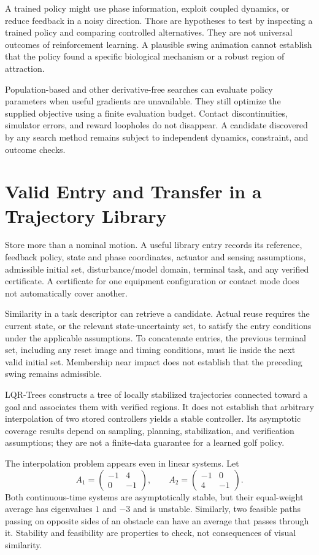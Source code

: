 \documentclass[12pt, openany]{book}
\theoremstyle{plain}
\begin{document}
A trained policy might use phase information, exploit coupled dynamics, or reduce feedback in a noisy direction. Those are hypotheses to test by inspecting a trained policy and comparing controlled alternatives. They are not universal outcomes of reinforcement learning. A plausible swing animation cannot establish that the policy found a specific biological mechanism or a robust region of attraction.

Population-based and other derivative-free searches can evaluate policy parameters when useful gradients are unavailable. They still optimize the supplied objective using a finite evaluation budget. Contact discontinuities, simulator errors, and reward loopholes do not disappear. A candidate discovered by any search method remains subject to independent dynamics, constraint, and outcome checks.

\section{Valid Entry and Transfer in a Trajectory Library}

Store more than a nominal motion. A useful library entry records its reference, feedback policy, state and phase coordinates, actuator and sensing assumptions, admissible initial set, disturbance/model domain, terminal task, and any verified certificate. A certificate for one equipment configuration or contact mode does not automatically cover another.

Similarity in a task descriptor can retrieve a candidate. Actual reuse requires the current state, or the relevant state-uncertainty set, to satisfy the entry conditions under the applicable assumptions. To concatenate entries, the previous terminal set, including any reset image and timing conditions, must lie inside the next valid initial set. Membership near impact does not establish that the preceding swing remains admissible.

LQR-Trees constructs a tree of locally stabilized trajectories connected toward a goal and associates them with verified regions. It does not establish that arbitrary interpolation of two stored controllers yields a stable controller. Its asymptotic coverage results depend on sampling, planning, stabilization, and verification assumptions; they are not a finite-data guarantee for a learned golf policy.

The interpolation problem appears even in linear systems. Let
\begin{equation}
A_1=\begin{pmatrix}-1&4\\0&-1\end{pmatrix},\qquad
A_2=\begin{pmatrix}-1&0\\4&-1\end{pmatrix}.
\end{equation}
Both continuous-time systems are asymptotically stable, but their equal-weight average has eigenvalues $1$ and $-3$ and is unstable. Similarly, two feasible paths passing on opposite sides of an obstacle can have an average that passes through it. Stability and feasibility are properties to check, not consequences of visual similarity.
\end{document}
